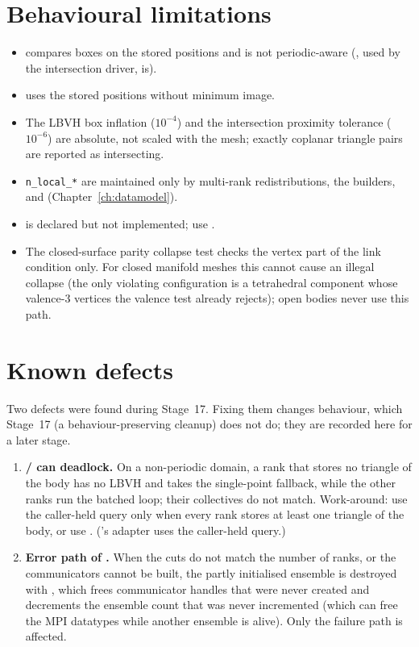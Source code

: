\section{Behavioural limitations}

\begin{itemize}
  \item {} compares boxes on the stored positions and is not
    periodic-aware (, used by the intersection driver, is).
  \item {} uses the stored positions without minimum image.
  \item The LBVH box inflation ($10^{-4}$) and the intersection proximity tolerance ($10^{-6}$)
    are absolute, not scaled with the mesh; exactly coplanar triangle pairs are reported as
    intersecting.
  \item \texttt{n\_local\_*} are maintained only by multi-rank redistributions, the builders,
     and  (Chapter~\ref{ch:datamodel}).
  \item {} is declared but not implemented; use .
  \item The closed-surface parity collapse test checks the vertex part of the link condition
    only. For closed manifold meshes this cannot cause an illegal collapse (the only violating
    configuration is a tetrahedral component whose valence-3 vertices the \mftlone{} valence
    test already rejects); open bodies never use this path.
\end{itemize}

\section{Known defects}
\label{sec:known-defects}

Two defects were found during Stage~17. Fixing them changes behaviour, which Stage~17 (a
behaviour-preserving cleanup) does not do; they are recorded here for a later stage.
\begin{enumerate}
  \item \textbf{ /  can deadlock.} On a
    non-periodic domain, a rank that stores no triangle of the body has no LBVH and takes the
    single-point fallback, while the other ranks run the batched loop; their collectives do not
    match. Work-around: use the caller-held query only when every rank stores at least one triangle
    of the body, or use . (\multi's adapter uses the caller-held query.)
  \item \textbf{Error path of .} When the cuts do not match the number of
    ranks, or the communicators cannot be built, the partly initialised ensemble is destroyed
    with , which frees communicator handles that were never created and
    decrements the ensemble count that was never incremented (which can free the MPI datatypes
    while another ensemble is alive). Only the failure path is affected.
\end{enumerate}
